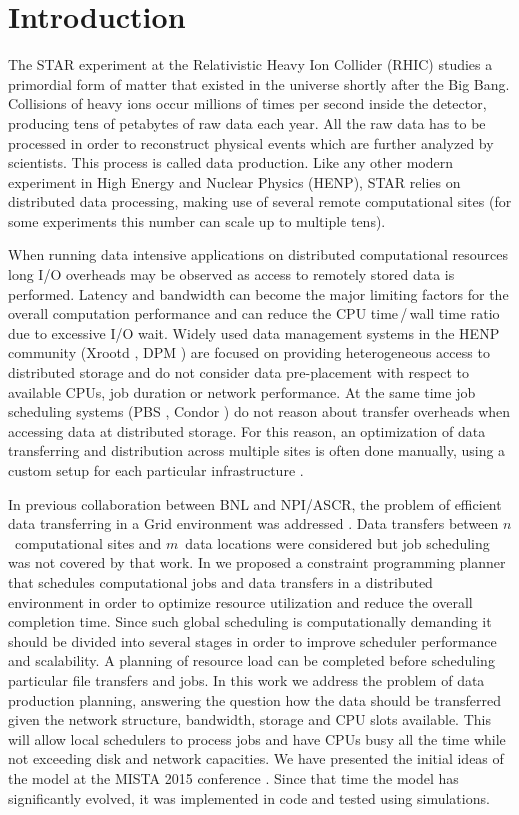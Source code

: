 \documentclass{svjour3}                     %
\begin{document}
\section{Introduction}
\label{intro}
The STAR experiment \cite{STAR} at the Relativistic Heavy Ion Collider (RHIC) studies a
primordial form of matter that existed in the universe shortly after the Big
Bang. Collisions of heavy ions occur millions of times per second inside the
detector, producing tens of petabytes of raw data each year. All the raw data
has to be processed in order to reconstruct physical events which are
further analyzed by scientists. This process is called data production.  Like
any other modern experiment in High Energy and Nuclear Physics (HENP), STAR relies on distributed data processing, making use of several remote computational sites
(for some experiments this number can scale up to multiple tens).

When running data intensive applications on distributed computational
resources long I/O overheads may be observed as access to remotely stored data
is performed. Latency and bandwidth can become the major limiting factors for
the overall computation performance and can reduce the CPU time\,/\,wall time 
ratio due to excessive I/O wait. 
Widely used data management systems in the HENP community
(Xrootd \cite{Xrootd}, DPM \cite{DPM}) are focused on providing heterogeneous access to distributed
storage and do not consider data pre-placement with respect to available CPUs,
job duration or network performance. At the same time job scheduling systems
(PBS \cite{PBS}, Condor \cite{Torque}) do not reason about transfer overheads when accessing data at
distributed storage. For this reason, an optimization of data transferring and
distribution across multiple sites is often done manually, using a custom
setup for each particular infrastructure \cite{Balewski}. 

In previous collaboration between BNL and NPI/ASCR, the problem of
efficient data transferring in a Grid environment was addressed \cite{Zerola}.
Data transfers between $n$~computational sites and $m$~data locations were
considered but job scheduling was not covered
by that work. In \cite{ACAT_cp} we
proposed a constraint programming planner that schedules computational jobs
and data transfers in a distributed environment in order to optimize resource
utilization and reduce the overall completion time. Since such global
scheduling is computationally demanding it should be divided into several
stages in order to improve scheduler performance and scalability. A planning of
resource load can be completed before scheduling particular file
transfers and jobs. In this work we address the problem of data production
planning, answering the question how the data should be transferred given the
network structure, bandwidth, storage and CPU slots available. This will allow
local schedulers to process jobs and have CPUs busy all the time while not
exceeding disk and network capacities. 
We have presented the initial ideas of the model at the MISTA 2015 conference \cite{MISTA}. Since that time the model has significantly evolved, it was implemented in code and tested using simulations. 
\end{document}
